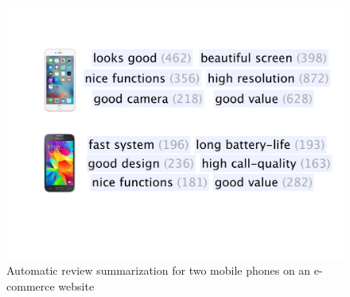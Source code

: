 %
\begin{figure}[t]
	\centering
	\includegraphics[width=0.9\columnwidth]{figures/phrases}
	\caption{Automatic review summarization for two mobile phones 
		on an e-commerce website}
	\label{fig:phrases}
\end{figure}

